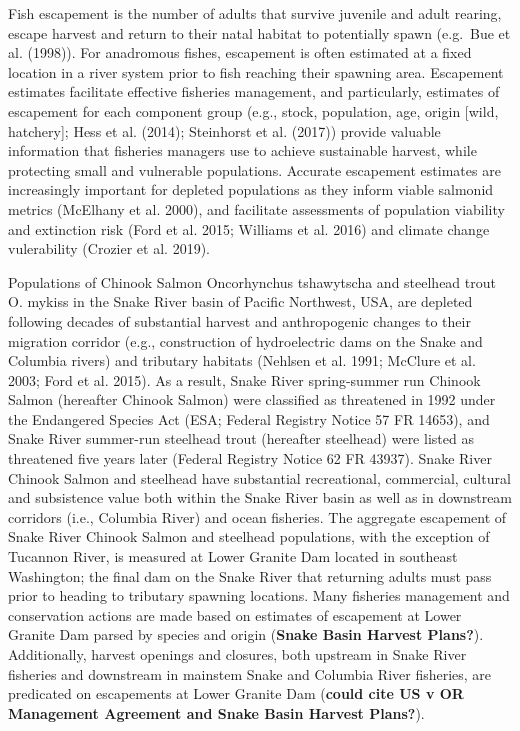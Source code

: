 \documentclass[
  12pt,
]{article}
\begin{document}
Fish escapement is the number of adults that survive juvenile and adult rearing, escape harvest and return to their natal habitat to potentially spawn (e.g.~Bue et al. (1998)). For anadromous fishes, escapement is often estimated at a fixed location in a river system prior to fish reaching their spawning area. Escapement estimates facilitate effective fisheries management, and particularly, estimates of escapement for each component group (e.g., stock, population, age, origin {[}wild, hatchery{]}; Hess et al. (2014); Steinhorst et al. (2017)) provide valuable information that fisheries managers use to achieve sustainable harvest, while protecting small and vulnerable populations. Accurate escapement estimates are increasingly important for depleted populations as they inform viable salmonid metrics (McElhany et al. 2000), and facilitate assessments of population viability and extinction risk (Ford et al. 2015; Williams et al. 2016) and climate change vulerability (Crozier et al. 2019).

Populations of Chinook Salmon Oncorhynchus tshawytscha and steelhead trout O. mykiss in the Snake River basin of Pacific Northwest, USA, are depleted following decades of substantial harvest and anthropogenic changes to their migration corridor (e.g., construction of hydroelectric dams on the Snake and Columbia rivers) and tributary habitats (Nehlsen et al. 1991; McClure et al. 2003; Ford et al. 2015). As a result, Snake River spring-summer run Chinook Salmon (hereafter Chinook Salmon) were classified as threatened in 1992 under the Endangered Species Act (ESA; Federal Registry Notice 57 FR 14653), and Snake River summer-run steelhead trout (hereafter steelhead) were listed as threatened five years later (Federal Registry Notice 62 FR 43937). Snake River Chinook Salmon and steelhead have substantial recreational, commercial, cultural and subsistence value both within the Snake River basin as well as in downstream corridors (i.e., Columbia River) and ocean fisheries. The aggregate escapement of Snake River Chinook Salmon and steelhead populations, with the exception of Tucannon River, is measured at Lower Granite Dam located in southeast Washington; the final dam on the Snake River that returning adults must pass prior to heading to tributary spawning locations. Many fisheries management and conservation actions are made based on estimates of escapement at Lower Granite Dam parsed by species and origin (\textbf{Snake Basin Harvest Plans?}). Additionally, harvest openings and closures, both upstream in Snake River fisheries and downstream in mainstem Snake and Columbia River fisheries, are predicated on escapements at Lower Granite Dam (\textbf{could cite US v OR Management Agreement and Snake Basin Harvest Plans?}).
\end{document}
